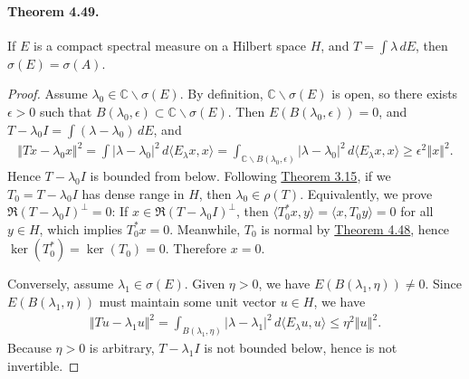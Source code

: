 \documentclass{article}
\begin{document}
\paragraph{Theorem 4.49.\label{thm:4.49}} If $E$ is a compact spectral measure on a Hilbert space $H$, and $T=\int\lambda\,dE$, then $\sigma(E)=\sigma(A)$.
\begin{proof}
Assume $\lambda_0\in\mathbb{C}\backslash\sigma(E)$. By definition, $\mathbb{C}\backslash\sigma(E)$ is open, so there exists $\epsilon>0$ such that $B(\lambda_0,\epsilon)\subset\mathbb{C}\backslash\sigma(E)$. Then $E(B(\lambda_0,\epsilon))=0$, and $T-\lambda_0 I=\int(\lambda-\lambda_0)\,dE$, and 
\begin{align*}
	\Vert Tx-\lambda_0 x\Vert^2 = \int\vert\lambda-\lambda_0\vert^2\,d\langle E_\lambda x,x\rangle = \int_{\mathbb{C}\backslash B(\lambda_0,\epsilon)}\vert\lambda-\lambda_0\vert^2\,d\langle E_\lambda x,x\rangle\geq \epsilon^2\left\Vert x\right\Vert^2.
\end{align*}
Hence $T-\lambda_0 I$ is bounded from below. Following \hyperref[thm:3.15]{Theorem 3.15}, if we $T_0=T-\lambda_0 I$ has dense range in $H$, then $\lambda_0\in\rho(T)$. Equivalently, we prove $\mathfrak{R}(T-\lambda_0 I)^\perp=0$: If $x\in\mathfrak{R}(T-\lambda_0 I)^\perp$, then $\langle T_0^* x,y\rangle = \langle x,T_0y\rangle = 0$ for all $y\in H$, which implies $T_0^*x=0$. Meanwhile, $T_0$ is normal by \hyperref[thm:4.48]{Theorem 4.48}, hence $\ker(T_0^*)=\ker(T_0)=0$. Therefore $x=0$.\vspace{0.1cm}

Conversely, assume $\lambda_1\in\sigma(E)$. Given $\eta>0$, we have $E(B(\lambda_1,\eta))\neq 0$. Since $E(B(\lambda_1,\eta))$ must maintain some unit vector $u\in H$, we have
\begin{align*}
	\Vert Tu-\lambda_1 u\Vert^2 = \int_{B(\lambda_1,\eta)}\vert\lambda-\lambda_1\vert^2\,d\langle E_\lambda u,u\rangle \leq \eta^2\left\Vert u\right\Vert^2.
\end{align*}
Because $\eta>0$ is arbitrary, $T-\lambda_1 I$ is not bounded below, hence is not invertible.
\end{proof}
\end{document}
